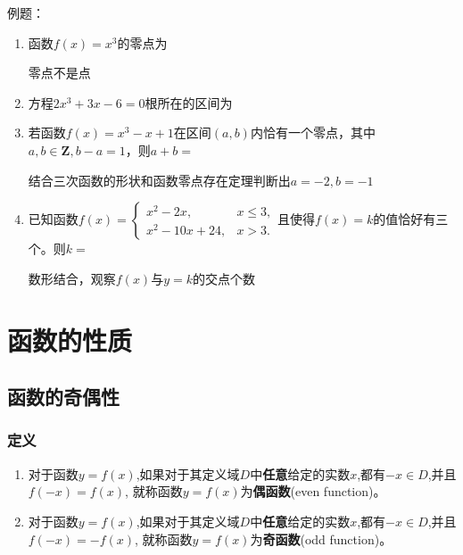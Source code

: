 例题：
\begin{enumerate}
    \item 函数$f(x) = x^3$的零点为
    \begin{jieda}
        零点不是点
    \end{jieda}
    \item 方程$2x^3+3x-6 = 0$根所在的区间为
    \xx{$[-1, 0]$}{$[0, 1]$}{$[1, 2]$}{$[3,4]$}
    \item 若函数$f(x) = x^3-x+1$在区间$(a, b)$内恰有一个零点，其中$a, b \in \mathbf{Z}, b-a = 1$，则$a+b = $
    \begin{jieda}
        结合三次函数的形状和函数零点存在定理判断出$a = -2, b = -1$
    \end{jieda}
    
    \item 已知函数$f(x) =  \left\{ 
         \begin{array}{ll}  
            x^2 - 2x, & x \leq 3, \\ 
            x^2 - 10x + 24, & x > 3.
         \end{array}
        \right. $且使得$f(x) = k$的值恰好有三个。则$k = $
    \begin{jieda}
        数形结合，观察$f(x)$与$y = k$的交点个数
    \end{jieda}
\end{enumerate}

\section*{函数的性质}
\subsection*{函数的奇偶性}
\subsubsection*{定义}
\begin{enumerate}
    \item 对于函数$y=f(x)$,如果对于其定义域$D$中\textbf{任意}给定的实数$x$,都有$-x \in D$,并且$f(-x)=f(x)$, 就称函数$y=f(x)$为\textbf{偶函数}(even function)。
    \item 对于函数$y=f(x)$,如果对于其定义域$D$中\textbf{任意}给定的实数$x$,都有$-x \in D$,并且$f(-x)=-f(x)$, 就称函数$y=f(x)$为\textbf{奇函数}(odd function)。
\end{enumerate}
